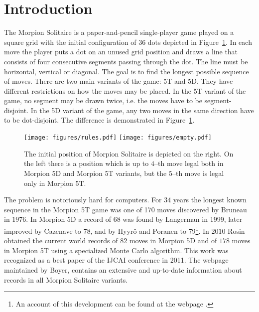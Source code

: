 
\section{Introduction}
The Morpion Solitaire is a paper-and-pencil single-player game played on a square grid with 
  the initial configuration of 36 dots depicted in Figure~\ref{fig:initial}. 
In each move the player puts a dot on an unused grid position and draws a line that 
  consists of four consecutive segments passing through the dot. 
The line must be horizontal, vertical or diagonal. 
The goal is to find the longest possible sequence of moves.
There are two main variants of the game: 5T and 5D. 
They have different restrictions on how the moves may be placed.
In the 5T variant of the game, no segment may be drawn twice, i.e. the moves have to be segment-disjoint. 
In the 5D variant of the game, any two moves in the same direction have to be dot-disjoint.
The difference is demonstrated in Figure~\ref{fig:initial}. %

  \begin{figure}
    \centering
      \texttt{[image: figures/rules.pdf]}
      \texttt{[image: figures/empty.pdf]}
      \caption{\label{fig:initial}
	The initial position of Morpion Solitaire is depicted on the right. On the left there is a position which is up to $4$--th move legal 
both in Morpion 5D and Morpion 5T variants, but the $5$--th move is legal only in Morpion 5T. 
      }
\end{figure}

The problem is notoriously hard for computers. 
For $34$ years the longest known sequence in the Morpion 5T game
  was one of 170 moves discovered by Bruneau in $1976$. In Morpion 5D a record of 68 was found by Langerman in 1999, later improved by Cazenave \cite{tristan78} to 78, and by Hyyrö and Poranen \cite{finowie} to 79\footnote{An account of this development can be found at the webpage \cite{langerman}.}.
In $2010$ Rosin \cite{rosin} obtained the current world records of $82$ moves in Morpion 5D and of $178$ moves in Morpion 5T 
  using a specialized Monte Carlo algorithm. This work  was
   recognized as a best paper of the IJCAI conference in 2011. The webpage~\cite{boyer} maintained by Boyer, contains an extensive and up-to-date information about records in all Morpion Solitaire variants.

